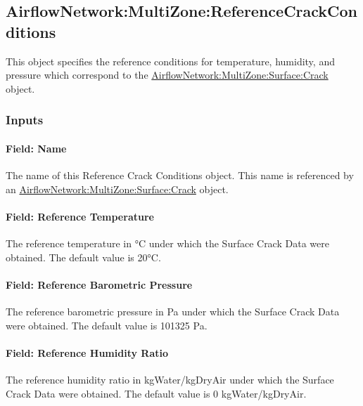 \subsection{AirflowNetwork:MultiZone:ReferenceCrackConditions}\label{airflownetworkmultizonereferencecrackconditions}

This object specifies the reference conditions for temperature, humidity, and pressure which correspond to the \hyperref[airflownetworkmultizonesurfacecrack]{AirflowNetwork:MultiZone:Surface:Crack} object.

\subsubsection{Inputs}\label{inputs-1-004}

\paragraph{Field: Name}\label{field-name-1-003}

The name of this Reference Crack Conditions object. This name is referenced by an \hyperref[airflownetworkmultizonesurfacecrack]{AirflowNetwork:MultiZone:Surface:Crack} object.

\paragraph{Field: Reference Temperature}\label{field-reference-temperature}

The reference temperature in °C under which the Surface Crack Data were obtained. The default value is 20°C.

\paragraph{Field: Reference Barometric Pressure}\label{field-reference-barometric-pressure}

The reference barometric pressure in Pa under which the Surface Crack Data were obtained. The default value is 101325 Pa.

\paragraph{Field: Reference Humidity Ratio}\label{field-reference-humidity-ratio}

The reference humidity ratio in kgWater/kgDryAir under which the Surface Crack Data were obtained. The default value is 0 kgWater/kgDryAir.


